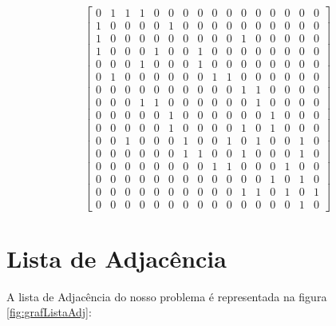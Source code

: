 \begin{equation} \label{eq:matrizAdj}
	\begin{bmatrix}
		0 & 1 & 1 & 1 & 0 & 0 & 0 & 0 & 0 & 0 & 0 & 0 & 0 & 0 & 0 & 0 \\%
		1 & 0 & 0 & 0 & 0 & 1 & 0 & 0 & 0 & 0 & 0 & 0 & 0 & 0 & 0 & 0 \\%
		1 & 0 & 0 & 0 & 0 & 0 & 0 & 0 & 0 & 0 & 1 & 0 & 0 & 0 & 0 & 0 \\%
		1 & 0 & 0 & 0 & 1 & 0 & 0 & 1 & 0 & 0 & 0 & 0 & 0 & 0 & 0 & 0 \\%
		0 & 0 & 0 & 1 & 0 & 0 & 0 & 1 & 0 & 0 & 0 & 0 & 0 & 0 & 0 & 0 \\%
		0 & 1 & 0 & 0 & 0 & 0 & 0 & 0 & 1 & 1 & 0 & 0 & 0 & 0 & 0 & 0 \\%
		0 & 0 & 0 & 0 & 0 & 0 & 0 & 0 & 0 & 0 & 1 & 1 & 0 & 0 & 0 & 0 \\%
		0 & 0 & 0 & 1 & 1 & 0 & 0 & 0 & 0 & 0 & 0 & 1 & 0 & 0 & 0 & 0 \\%
		0 & 0 & 0 & 0 & 0 & 1 & 0 & 0 & 0 & 0 & 0 & 0 & 1 & 0 & 0 & 0 \\%
		0 & 0 & 0 & 0 & 0 & 1 & 0 & 0 & 0 & 0 & 1 & 0 & 1 & 0 & 0 & 0 \\%
		0 & 0 & 1 & 0 & 0 & 0 & 1 & 0 & 0 & 1 & 0 & 1 & 0 & 0 & 1 & 0 \\%
		0 & 0 & 0 & 0 & 0 & 0 & 1 & 1 & 0 & 0 & 1 & 0 & 0 & 0 & 1 & 0 \\%
		0 & 0 & 0 & 0 & 0 & 0 & 0 & 0 & 1 & 1 & 0 & 0 & 0 & 1 & 0 & 0 \\%
		0 & 0 & 0 & 0 & 0 & 0 & 0 & 0 & 0 & 0 & 0 & 0 & 1 & 0 & 1 & 0 \\%
		0 & 0 & 0 & 0 & 0 & 0 & 0 & 0 & 0 & 0 & 1 & 1 & 0 & 1 & 0 & 1 \\%
		0 & 0 & 0 & 0 & 0 & 0 & 0 & 0 & 0 & 0 & 0 & 0 & 0 & 0 & 1 & 0 %
	\end{bmatrix}
\end{equation}



\section{Lista de Adjacência}\label{sec:lista}

A lista de Adjacência do nosso problema é representada na figura \ref{fig:grafListaAdj}:


